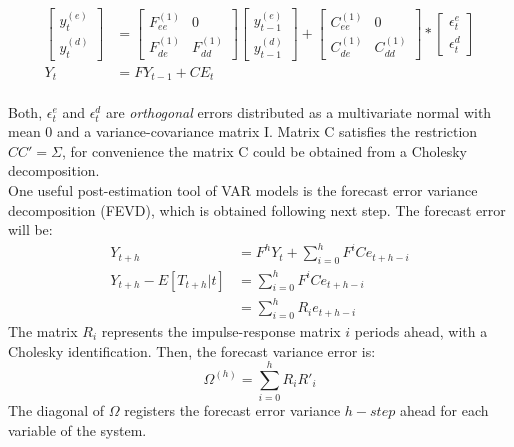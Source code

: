 \documentclass[12pt, a4paper]{article}
\begin{document}
	\begin{equation}
	   \begin{aligned}
	     \left[ \begin{array}{c}  y^{(e)}_t  \\ y^{(d)}_t \end{array} \right] 
	    & =
		\left[ \begin{array}{cc}  F_{ee}^{(1)} & 0 \\ F_{de}^{(1)} & F_{dd}^{(1)} \end{array} \right] 
		\left[ \begin{array}{c}  y^{(e)}_{t-1}  \\ y^{(d)}_{t-1}  \end{array} \right] 
	 	+
    	\left[ \begin{array}{cc}  C_{ee}^{(1)} & 0 \\ C_{de}^{(1)} & C_{dd}^{(1)} \end{array} \right]  *\left[ \begin{array}{c}  \epsilon^e_{t}  \\ \epsilon^d_{t}  \end{array} \right]  \\
	   Y_t & = F Y_{t-1} + C E_t
	\end{aligned}
	\end{equation} \\	
Both, $\epsilon^e_{t}$ and $\epsilon^d_{t}$ are \textit{orthogonal} errors distributed as a multivariate normal with mean 0 and a variance-covariance matrix I. Matrix C satisfies the restriction $CC' = \Sigma$, for convenience the matrix C could be obtained from a Cholesky decomposition. \\
One useful post-estimation tool of VAR models is the forecast error variance decomposition (FEVD), which is obtained following next step. The forecast error will be:
\begin{equation*}
\begin{aligned}
	Y_{t+h} & = F^h Y_t + \sum_{i=0}^h F^{i} C e_{t+h-i}\\
	Y_{t+h}  - E[T_{t+h}|t]& = \sum_{i=0}^h F^{i} C e_{t+h-i} \\
	 & = \sum_{i=0}^h R_{i} e_{t+h-i}
\end{aligned}
\end{equation*}
The matrix $R_i$ represents the impulse-response matrix $i$ periods ahead, with a Cholesky identification. Then, the forecast variance error is:
\begin{equation}
	 \Omega^{(h)} = \sum_{i=0}^h R_{i} R'_{i}
\end{equation}
The diagonal of $\Omega$ registers the forecast error variance $h-step$ ahead for each variable of the system.
\end{document}
